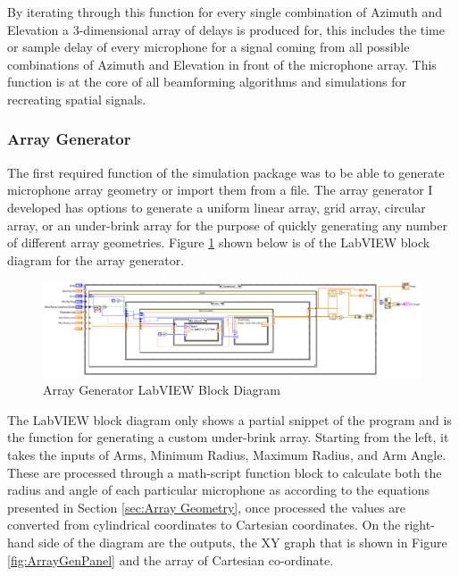\documentclass{UoNMCHA}
\numberwithin{equation}{section}
\begin{document}
    By iterating through this function for every single combination of Azimuth and Elevation a 3-dimensional array of delays is produced for, this includes the time or sample delay of every microphone for a signal coming from all possible combinations of Azimuth and Elevation in front of the microphone array. This function is at the core of all beamforming algorithms and simulations for recreating spatial signals.
    
\subsubsection{Array Generator} \label{sec:Array Generator}
    The first required function of the simulation package was to be able to generate microphone array geometry or import them from a file. The array generator I developed has options to generate a uniform linear array, grid array, circular array, or an under-brink array for the purpose of quickly generating any number of different array geometries. Figure \ref{fig:ArrayGenBlock} shown below is of the LabVIEW block diagram for the array generator.
    
    \begin{figure}[H]
        \centering
        \includegraphics[keepaspectratio, width = \textwidth]{Figures/ArrayGenBlock.png}
        \caption{Array Generator LabVIEW Block Diagram}
        \label{fig:ArrayGenBlock}
    \end{figure}
    
    The LabVIEW block diagram only shows a partial snippet of the program and is the function for generating a custom under-brink array. Starting from the left, it takes the inputs of Arms, Minimum Radius, Maximum Radius, and Arm Angle. These are processed through a math-script function block to calculate both the radius and angle of each particular microphone as according to the equations presented in Section \ref{sec:Array Geometry}, once processed the values are converted from cylindrical coordinates to Cartesian coordinates. On the right-hand side of the diagram are the outputs, the XY graph that is shown in Figure \ref{fig:ArrayGenPanel} and the array of Cartesian co-ordinate.
    
\end{document}
